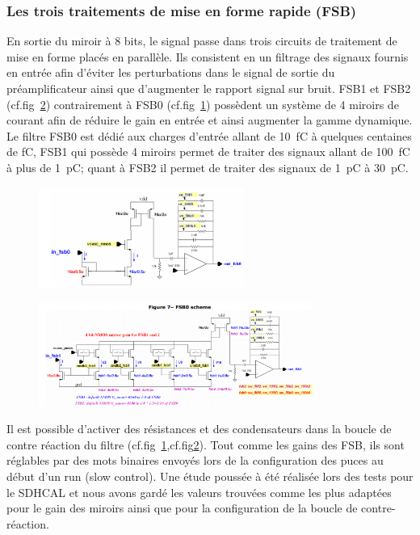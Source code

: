 \subsubsection{Les trois traitements de mise en forme rapide (FSB)}
En sortie du miroir à \num{8} bits, le signal passe dans trois circuits de traitement de mise en forme placés en parallèle. Ils consistent en un filtrage des signaux fournis en entrée afin d'éviter les perturbations dans le signal de sortie du préamplificateur ainsi que d'augmenter le rapport signal sur bruit. FSB1 et FSB2 (cf.fig~\ref{fsb1}) contrairement à FSB0 (cf.fig~\ref{fsb0}) possèdent un système de \num{4} miroirs de courant afin de réduire le gain en entrée et ainsi augmenter la gamme dynamique. Le filtre FSB0 est dédié aux charges d'entrée allant de \SI{10}{\femto\coulomb} à quelques centaines de \si{\femto\coulomb}, FSB1 qui possède \num{4} miroirs permet de traiter des signaux allant de \SI{100}{\femto\coulomb} à plus de \SI{1}{\pico\coulomb}; quant à FSB2 il permet de traiter des signaux de \SI{1}{\pico\coulomb} à \SI{30}{\pico\coulomb}.

\begin{figure}[ht!]
	\centering
	\includegraphics[width=0.60\textwidth]{GLA/FSB0.png}
	\label{fsb0}
\end{figure}

\begin{figure}[ht!]
	\centering
	\includegraphics[width=0.8\textwidth]{GLA/FSB1.png}
	\label{fsb1}
\end{figure}

Il est possible d'activer des résistances et des condensateurs dans la boucle de contre réaction du filtre (cf.fig~\ref{fsb0},cf.fig\ref{fsb1}). Tout comme les gains des FSB, ils sont réglables par des mots binaires envoyés lors de la configuration des puces au début d'un run (slow control). Une étude poussée à été réalisée lors des tests pour le SDHCAL et nous avons gardé les valeurs trouvées comme les plus adaptées pour le gain des miroirs ainsi que pour la configuration de la boucle de contre-réaction.

